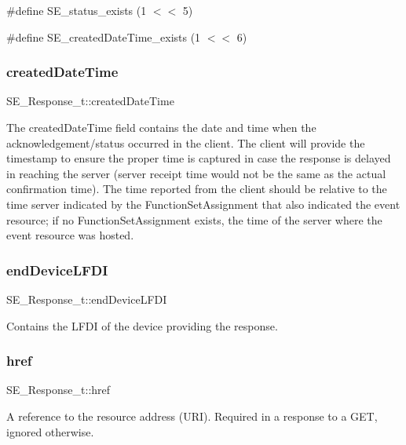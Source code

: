 \#define S\+E\+\_\+status\+\_\+exists (1 $<$$<$ 5)

\#define S\+E\+\_\+created\+Date\+Time\+\_\+exists (1 $<$$<$ 6) \mbox{\label{group__Response_ga45bb118c1fa5e91243ebcb39d47c5726}} 
\subsubsection{\texorpdfstring{created\+Date\+Time}{createdDateTime}}
{\footnotesize\ttfamily S\+E\+\_\+\+Response\+\_\+t\+::created\+Date\+Time}

The created\+Date\+Time field contains the date and time when the acknowledgement/status occurred in the client. The client will provide the timestamp to ensure the proper time is captured in case the response is delayed in reaching the server (server receipt time would not be the same as the actual confirmation time). The time reported from the client should be relative to the time server indicated by the Function\+Set\+Assignment that also indicated the event resource; if no Function\+Set\+Assignment exists, the time of the server where the event resource was hosted. \mbox{\label{group__Response_ga3b3495ba64ae18f96b7fb7c4f6c68d59}} 
\subsubsection{\texorpdfstring{end\+Device\+L\+F\+DI}{endDeviceLFDI}}
{\footnotesize\ttfamily S\+E\+\_\+\+Response\+\_\+t\+::end\+Device\+L\+F\+DI}

Contains the L\+F\+DI of the device providing the response. \mbox{\label{group__Response_gad5bd6b0cc37466b254ddff1efd5cd74f}} 
\subsubsection{\texorpdfstring{href}{href}}
{\footnotesize\ttfamily S\+E\+\_\+\+Response\+\_\+t\+::href}

A reference to the resource address (U\+RI). Required in a response to a G\+ET, ignored otherwise. \mbox{\label{group__Response_gac086b296f75d2f0ff0eecf0fd9271c75}} 
